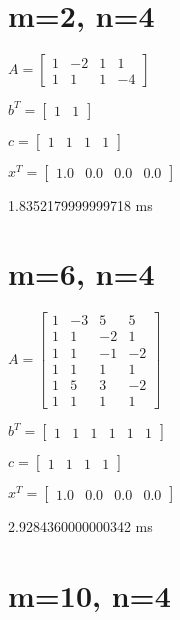 \documentclass[8pt]{article}
\begin{document}
\section{ m=2, n=4 }



$ A =
\begin{bmatrix}
  1  & -2  &  1  &  1 \\
  1  &  1  &  1  & -4 
\end{bmatrix}
$


$ b^T =
\begin{bmatrix}
  1  &  1 
\end{bmatrix}
$


$ c =
\begin{bmatrix}
  1  &  1  &  1  &  1 
\end{bmatrix}
$


$ x^T =
\begin{bmatrix}
  1.0 &  0.0 &  0.0 &  0.0
\end{bmatrix}
$


1.8352179999999718  ms


\section{ m=6, n=4 }



$ A =
\begin{bmatrix}
  1  & -3  &  5  &  5 \\
  1  &  1  & -2  &  1 \\
  1  &  1  & -1  & -2 \\
  1  &  1  &  1  &  1 \\
  1  &  5  &  3  & -2 \\
  1  &  1  &  1  &  1 
\end{bmatrix}
$


$ b^T =
\begin{bmatrix}
  1  &  1  &  1  &  1  &  1  &  1 
\end{bmatrix}
$


$ c =
\begin{bmatrix}
  1  &  1  &  1  &  1 
\end{bmatrix}
$


$ x^T =
\begin{bmatrix}
  1.0 &  0.0 &  0.0 &  0.0
\end{bmatrix}
$


2.9284360000000342  ms


\section{ m=10, n=4 }
\end{document}
